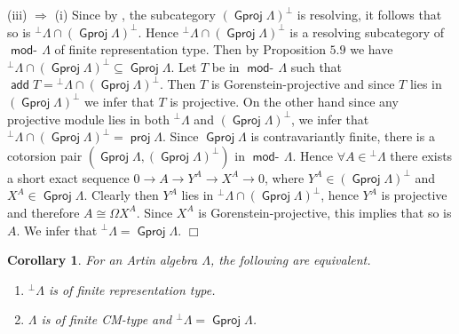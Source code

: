 \documentclass[oneside, a4paper,reqno]{amsart}
\numberwithin{equation}{section}
\newtheorem{cor}[thm]{Corollary}
\theoremstyle{definition}
\begin{document}
(iii) $\Rightarrow$ (i) Since by \cite{B:cm}, the subcategory
$({\operatorname{\mathsf{Gproj}}\nolimits}\Lambda)^{\bot}$ is resolving, it follows that so is
${^{\bot}}\Lambda \cap ({\operatorname{\mathsf{Gproj}}\nolimits}\Lambda)^{\bot}$. Hence
${^{\bot}}\Lambda \cap ({\operatorname{\mathsf{Gproj}}\nolimits}\Lambda)^{\bot}$  is a resolving
subcategory of $\operatorname*{\mathsf{mod}-\!}\Lambda$ of finite representation type. Then by
Proposition $5.9$ we have ${^{\bot}}\Lambda \cap
({\operatorname{\mathsf{Gproj}}\nolimits}\Lambda)^{\bot} \subseteq {\operatorname{\mathsf{Gproj}}\nolimits}\Lambda$. Let $T$ be in
$\operatorname*{\mathsf{mod}-\!}\Lambda$ such that $\operatorname*{\mathsf{add}} T = {^{\bot}}\Lambda \cap
({\operatorname{\mathsf{Gproj}}\nolimits}\Lambda)^{\bot}$. Then $T$ is Gorenstein-projective and since
$T$ lies in $({\operatorname{\mathsf{Gproj}}\nolimits}\Lambda)^{\bot}$ we infer that $T$ is
projective. On the other hand since any projective module lies in
both ${^{\bot}}\Lambda$ and $({\operatorname{\mathsf{Gproj}}\nolimits}\Lambda)^{\bot}$, we infer that
${^{\bot}}\Lambda \cap ({\operatorname{\mathsf{Gproj}}\nolimits}\Lambda)^{\bot} = \operatorname*{\mathsf{proj}}\Lambda$. Since
${\operatorname{\mathsf{Gproj}}\nolimits}\Lambda$ is contravariantly finite, there is a cotorsion pair
$({\operatorname{\mathsf{Gproj}}\nolimits}\Lambda,({\operatorname{\mathsf{Gproj}}\nolimits}\Lambda)^{\bot})$ in $\operatorname*{\mathsf{mod}-\!}\Lambda$. Hence
$\forall A \in {^{\bot}}\Lambda$ there exists a short exact sequence
$0 {\longrightarrow} A {\longrightarrow} Y^{A} {\longrightarrow} X^{A} {\longrightarrow} 0$, where $Y^{A} \in
({\operatorname{\mathsf{Gproj}}\nolimits}\Lambda)^{\bot}$ and $X^{A}\in {\operatorname{\mathsf{Gproj}}\nolimits}\Lambda$. Clearly then
$Y^{A}$ lies in ${^{\bot}}\Lambda \cap ({\operatorname{\mathsf{Gproj}}\nolimits}\Lambda)^{\bot}$,
hence $Y^{A}$ is projective and therefore $A \cong \Omega X^{A}$.
Since $X^{A}$ is Gorenstein-projective, this implies that so is $A$.
We infer that ${^{\bot}}\Lambda = {\operatorname{\mathsf{Gproj}}\nolimits}\Lambda$.  $\Box$

\begin{cor} For an Artin algebra $\Lambda$, the following are equivalent.
\begin{enumerate}
  \item ${^{\bot}}\Lambda$ is of finite representation type.
  \item $\Lambda$ is of finite CM-type and ${^{\bot}}\Lambda =
  {\operatorname{\mathsf{Gproj}}\nolimits}\Lambda$.
\end{enumerate}
\end{cor}
\end{document}
